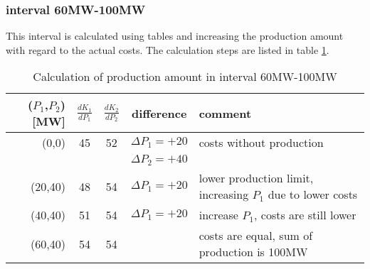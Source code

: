 \documentclass{article}
\begin{document}
	\subsubsection{interval 60MW-100MW}
This interval is calculated using tables and increasing the production amount with regard to the actual costs. The calculation steps are listed in table \ref{tab:60100MW}.
	\begin{table}[h!]
		\begin{center}
			\begin{tabular}[h]{|r||c|c|c||p{5cm}|}
				\hline 
				($P_1$,$P_2$) [MW] & $\frac{dK_1}{dP_1}$ & $\frac{dK_2}{dP_2}$ & difference & comment\\
				\hline
				\hline
				(0,0)	&	45	&	52	&	$\Delta P_1=+20$	&	costs without production									\\
						&    	&   	& 	$\Delta P_2=+40$ 	&					    										\\
				\hline
				(20,40) &	48	&	54	&	$\Delta P_1=+20$	&	lower production limit, increasing $P_1$ due to lower costs	\\
				\hline
				(40,40) &	51	&	54	&	$\Delta P_1=+20$	&	increase $P_1$, costs are still lower						\\
				\hline
				(60,40) &	54	&	54	&						&	costs are equal, sum of production is 100MW					\\
				\hline
			\end{tabular}
			\caption{Calculation of production amount in interval 60MW-100MW}\label{tab:60100MW}
		\end{center}
	\end{table}
\end{document}
